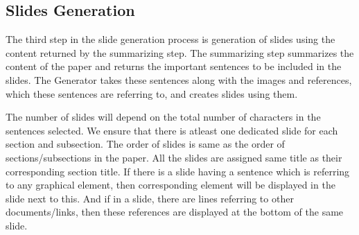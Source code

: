 \subsection{Slides Generation}

The third step in the slide generation process is generation of slides using 
the content returned by the summarizing step. The summarizing step summarizes 
the content of the paper and returns the important sentences to be included in the slides.
The Generator takes these sentences along with the images and references, which these
sentences are referring to, and creates slides using them.

The number of slides will depend on the total number of characters in the sentences selected.
We ensure that there is atleast one dedicated slide for each section and subsection.
The order of slides is same as the order of sections/subsections in the paper.
All the slides are assigned same title as their corresponding section title.
If there is a slide having a sentence which is referring to any graphical element, then
corresponding element will be displayed in the slide next to this. And if in a slide,
there are lines referring to other documents/links, then these references are displayed
at the bottom of the same slide.